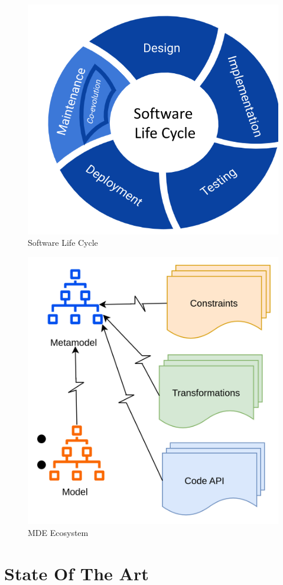 \begin{figure}[htbp]
	\begin{center}
		\includegraphics[width=0.6\linewidth]{./pics/soaPics/solicy.png}
	\end{center}
	\caption{Software Life Cycle}
	\label{fig:softwarelifecyle}
\end{figure}

\begin{figure}[htbp]
	\begin{center}
		\includegraphics[width=0.6\linewidth]{./pics/soaPics/mdeecosystem.png}
	\end{center}
	\caption{MDE Ecosystem}
	\label{fig:mde_ecosystem}
\end{figure}


\chapter{State Of The Art}

